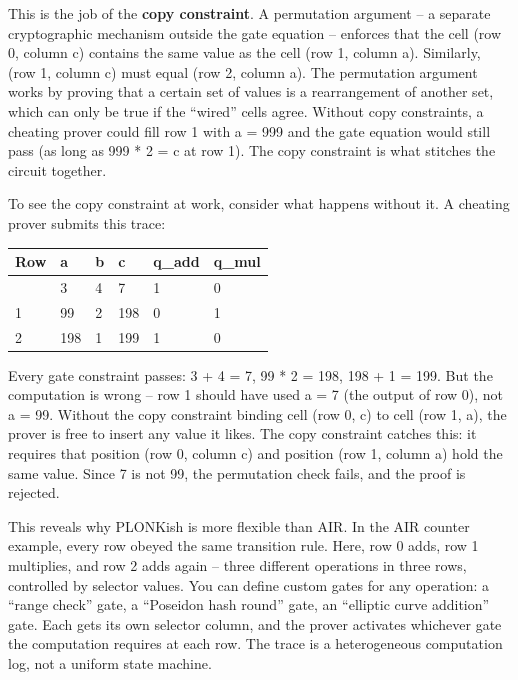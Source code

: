 \documentclass[
  11pt,
  openany]{report}
\renewcommand{\textbf}[1]{{\bfseries\color{MidnightBold}#1}}
\begin{document}
This is the job of the \textbf{copy constraint}. A permutation argument -- a
separate cryptographic mechanism outside the gate equation -- enforces that the
cell (row 0, column c) contains the same value as the cell (row 1, column a).
Similarly, (row 1, column c) must equal (row 2, column a). The permutation
argument works by proving that a certain set of values is a rearrangement of
another set, which can only be true if the ``wired'' cells agree. Without copy
constraints, a cheating prover could fill row 1 with a = 999 and the gate
equation would still pass (as long as 999 * 2 = c at row 1). The copy constraint
is what stitches the circuit together.

To see the copy constraint at work, consider what happens without it. A cheating
prover submits this trace:

\begin{longtable}[]{@{}llllll@{}}
\toprule\noalign{}
Row & a & b & c & q\_add & q\_mul \\
\midrule\noalign{}
\arrayrulecolor{MidnightBlue}\midrule\arrayrulecolor{MidnightBorder}
\endhead
\bottomrule\noalign{}
\endlastfoot
0 & 3 & 4 & 7 & 1 & 0 \\
1 & 99 & 2 & 198 & 0 & 1 \\
2 & 198 & 1 & 199 & 1 & 0 \\
\end{longtable}

Every gate constraint passes: 3 + 4 = 7, 99 * 2 = 198, 198 + 1 = 199. But the
computation is wrong -- row 1 should have used a = 7 (the output of row 0), not
a = 99. Without the copy constraint binding cell (row 0, c) to cell (row 1, a),
the prover is free to insert any value it likes. The copy constraint catches
this: it requires that position (row 0, column c) and position (row 1, column a)
hold the same value. Since 7 is not 99, the permutation check fails, and the
proof is rejected.

This reveals why PLONKish is more flexible than AIR. In the AIR counter example,
every row obeyed the same transition rule. Here, row 0 adds, row 1 multiplies,
and row 2 adds again -- three different operations in three rows, controlled by
selector values. You can define custom gates for any operation: a ``range
check'' gate, a ``Poseidon hash round'' gate, an ``elliptic curve addition''
gate. Each gets its own selector column, and the prover activates whichever gate
the computation requires at each row. The trace is a heterogeneous computation
log, not a uniform state machine.
\end{document}
